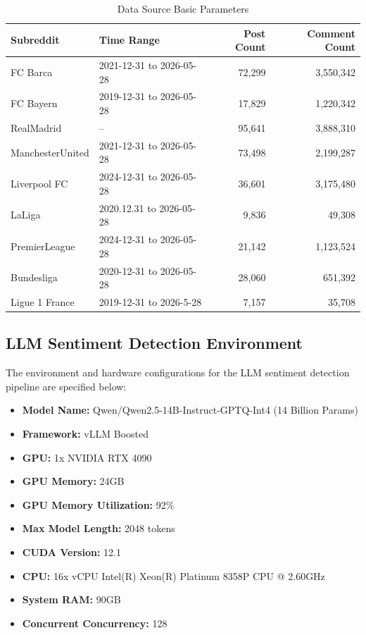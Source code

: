 \documentclass{article}
\begin{document}
\begin{table}[htbp]
\centering
\caption{Data Source Basic Parameters}
\label{tab:parameters}
\begin{tabular}{llrr}
\toprule
\textbf{Subreddit} & \textbf{Time Range} & \textbf{Post Count} & \textbf{Comment Count} \\
\midrule
FC Barca & 2021-12-31 to 2026-05-28 & 72,299 & 3,550,342 \\
FC Bayern & 2019-12-31 to 2026-05-28 & 17,829 & 1,220,342 \\
RealMadrid & -- & 95,641 & 3,888,310 \\
ManchesterUnited & 2021-12-31 to 2026-05-28 & 73,498 & 2,199,287 \\
Liverpool FC & 2024-12-31 to 2026-05-28 & 36,601 & 3,175,480 \\
LaLiga & 2020.12.31 to 2026-05-28 & 9,836 & 49,308 \\
PremierLeague & 2024-12-31 to 2026-05-28 & 21,142 & 1,123,524 \\
Bundesliga & 2020-12-31 to 2026-05-28 & 28,060 & 651,392 \\
Ligue 1 France & 2019-12-31 to 2026-5-28 & 7,157 & 35,708 \\
\bottomrule
\end{tabular}
\end{table}
\newpage
\subsection{LLM Sentiment Detection Environment}
The environment and hardware configurations for the LLM sentiment detection pipeline are specified below:
\begin{itemize}
    \item \textbf{Model Name:} Qwen/Qwen2.5-14B-Instruct-GPTQ-Int4 (14 Billion Params)
    \item \textbf{Framework:} vLLM Boosted
    \item \textbf{GPU:} 1x NVIDIA RTX 4090
    \item \textbf{GPU Memory:} 24GB
    \item \textbf{GPU Memory Utilization:} 92\%
    \item \textbf{Max Model Length:} 2048 tokens
    \item \textbf{CUDA Version:} 12.1
    \item \textbf{CPU:} 16x vCPU Intel(R) Xeon(R) Platinum 8358P CPU @ 2.60GHz
    \item \textbf{System RAM:} 90GB
    \item \textbf{Concurrent Concurrency:} 128
\end{itemize}
\end{document}
